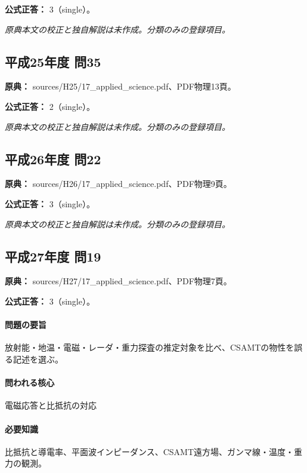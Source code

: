 \textbf{公式正答：} 3（single）。

\par\textit{原典本文の校正と独自解説は未作成。分類のみの登録項目。}

\subsection{平成25年度 問35}
\label{q:h25-reg-applied-35}

\noindent\textbf{原典：} sources/H25/17\_applied\_science.pdf、PDF物理13頁。

\textbf{公式正答：} 2（single）。

\par\textit{原典本文の校正と独自解説は未作成。分類のみの登録項目。}

\subsection{平成26年度 問22}
\label{q:h26-reg-applied-22}

\noindent\textbf{原典：} sources/H26/17\_applied\_science.pdf、PDF物理9頁。

\textbf{公式正答：} 3（single）。

\par\textit{原典本文の校正と独自解説は未作成。分類のみの登録項目。}

\subsection{平成27年度 問19}
\label{q:h27-reg-applied-19}

\noindent\textbf{原典：} sources/H27/17\_applied\_science.pdf、PDF物理7頁。

\textbf{公式正答：} 3（single）。

\paragraph{問題の要旨} 放射能・地温・電磁・レーダ・重力探査の推定対象を比べ、CSAMTの物性を誤る記述を選ぶ。

\paragraph{問われる核心} 電磁応答と比抵抗の対応

\paragraph{必要知識} 比抵抗と導電率、平面波インピーダンス、CSAMT遠方場、ガンマ線・温度・重力の観測。

